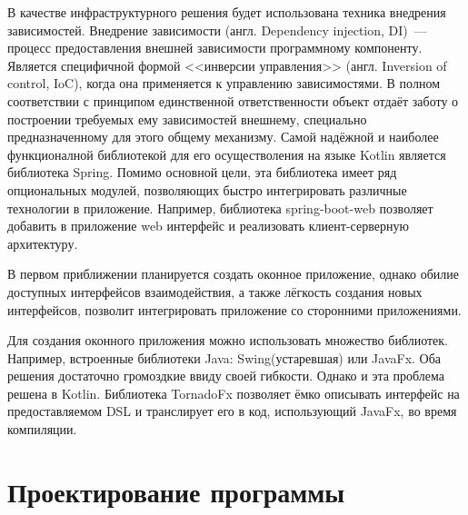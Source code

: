 В качестве инфраструктурного решения будет использована техника внедрения зависимостей.
Внедрение зависимости (англ. Dependency injection, DI)~--- процесс предоставления внешней зависимости программному компоненту. 
Является специфичной формой <<инверсии управления>> (англ. Inversion of control, IoC), когда она применяется к управлению зависимостями. 
В полном соответствии с принципом единственной ответственности объект отдаёт заботу о построении требуемых ему зависимостей внешнему, специально предназначенному для этого общему механизму.
Самой надёжной и наиболее функционалной библиотекой для его осуществоления на языке Kotlin является библиотека Spring.
Помимо основной цели, эта библиотека имеет ряд опциональных модулей, позволяющих быстро интегрировать различные технологии в приложение. 
Например, библиотека spring-boot-web позволяет добавить в приложение web интерфейс и реализовать клиент-серверную архитектуру.

В первом приближении планируется создать оконное приложение, однако обилие доступных интерфейсов взаимодействия, а также лёгкость создания новых интерфейсов, позволит интегрировать приложение со сторонними приложениями.

Для создания оконного приложения можно использовать множество библиотек. 
Например, встроенные библиотеки Java: Swing(устаревшая) или JavaFx. 
Оба решения достаточно громоздкие ввиду своей гибкости.
Однако и эта проблема решена в Kotlin. 
Библиотека TornadoFx позволяет ёмко описывать интерфейс на предоставляемом DSL и транслирует его в код, использующий JavaFx, во время компиляции.

\chapter{Проектирование программы}

